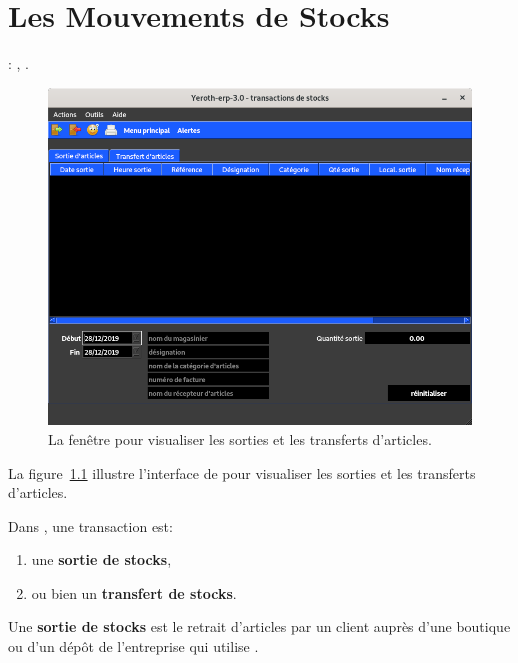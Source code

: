 \chapter{Les Mouvements de Stocks}\label{chap:mouvements-de-stocks}

\utilisateurs: \lienmagasinier, \lienmanager.\\



\begin{figure}[!htbp]
	\centering
	\includegraphics[scale=0.45]{images/yeren-transactions.png}
	\caption{La fen\^etre pour visualiser les sorties et les
		transferts d'articles.}
	\label{fig:yeren-transactions}
\end{figure}

La figure~\ref{fig:yeren-transactions} illustre
l'interface de \yeren pour visualiser les sorties et les
transferts d'articles.

Dans \yeren, une transaction est:
\begin{enumerate}[1)]
	\item une \textbf{sortie de stocks},
	\item ou bien un \textbf{transfert de stocks}.\\
\end{enumerate}

Une \textbf{sortie de stocks} est le retrait d'articles
par un client aupr\`es d'une boutique ou d'un d\'ep\^ot
de l'entreprise qui utilise \yeren.

